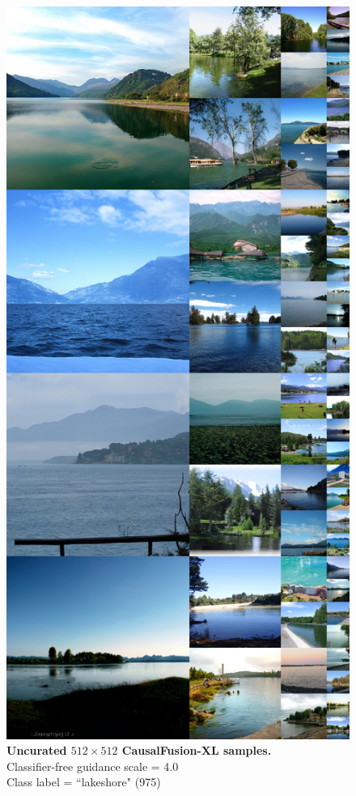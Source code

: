 \begin{figure}\centering
\includegraphics[width=\linewidth]{figs/xl512_975_cfg2.0.jpg}
\caption{\textbf{Uncurated $512\times512$ CausalFusion-XL samples.} \\Classifier-free guidance scale = 4.0\\Class label = ``lakeshore" (975)}\vspace{-2mm}
\label{fig:samples512_6}
\end{figure}


